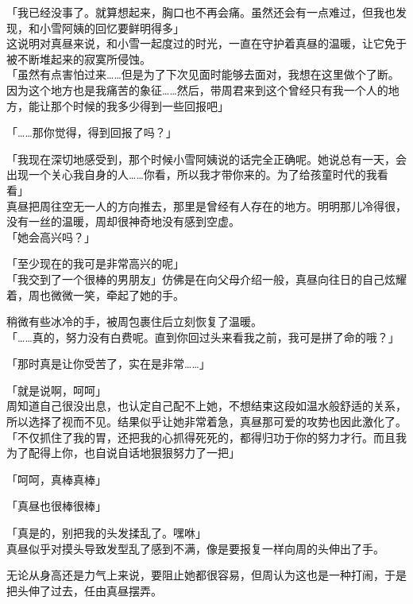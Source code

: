 「我已经没事了。就算想起来，胸口也不再会痛。虽然还会有一点难过，但我也发现，和小雪阿姨的回忆要鲜明得多」\\

这说明对真昼来说，和小雪一起度过的时光，一直在守护着真昼的温暖，让它免于被不断堆起来的寂寞所侵蚀。\\

「虽然有点害怕过来……但是为了下次见面时能够去面对，我想在这里做个了断。因为这个地方也是我痛苦的象征……然后，带周君来到这个曾经只有我一个人的地方，能让那个时候的我多少得到一些回报吧」

「……那你觉得，得到回报了吗？」

「我现在深切地感受到，那个时候小雪阿姨说的话完全正确呢。她说总有一天，会出现一个关心我自身的人……你看，所以我才带你来的。为了给孩童时代的我看看」\\

真昼把周往空无一人的方向推去，那里是曾经有人存在的地方。明明那儿冷得很，没有一丝的温暖，周却很神奇地没有感到空虚。\\

「她会高兴吗？」

「至少现在的我可是非常高兴的呢」\\

「我交到了一个很棒的男朋友」仿佛是在向父母介绍一般，真昼向往日的自己炫耀着，周也微微一笑，牵起了她的手。

稍微有些冰冷的手，被周包裹住后立刻恢复了温暖。\\

「……真的，努力没有白费呢。直到你回过头来看我之前，我可是拼了命的哦？」

「那时真是让你受苦了，实在是非常……」

「就是说啊，呵呵」\\

周知道自己很没出息，也认定自己配不上她，不想结束这段如温水般舒适的关系，所以选择了视而不见。结果似乎让她非常着急，真昼那可爱的攻势也因此激化了。\\

「不仅抓住了我的胃，还把我的心抓得死死的，都得归功于你的努力才行。而且我为了配得上你，也自说自话地狠狠努力了一把」

「呵呵，真棒真棒」

「真昼也很棒很棒」

「真是的，别把我的头发揉乱了。嘿咻」\\

真昼似乎对摸头导致发型乱了感到不满，像是要报复一样向周的头伸出了手。

无论从身高还是力气上来说，要阻止她都很容易，但周认为这也是一种打闹，于是把头伸了过去，任由真昼摆弄。\\

